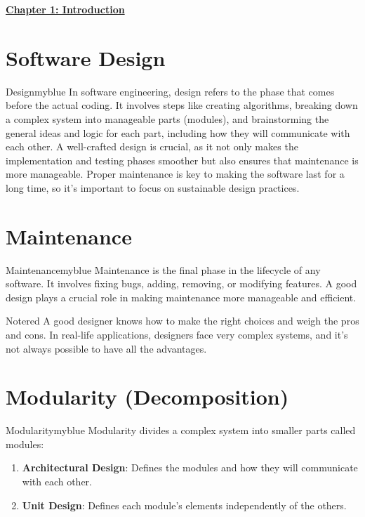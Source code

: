 \begin{center}
    \Huge{\textbf{\underline{Chapter 1: Introduction}}}
\end{center}

\setcounter{section}{0}

\vspace{0.35cm}


\section{Software Design}


\begin{prettyBox}{Design}{myblue}
In software engineering, design refers to the phase that comes before
the actual coding. It involves steps like creating algorithms, breaking
down a complex system into manageable parts (modules), and brainstorming
the general ideas and logic for each part, including how they will communicate
with each other. A well-crafted design is crucial, as it not only makes the
implementation and testing phases smoother but also ensures that maintenance 
is more manageable. Proper maintenance is key to making the software last 
for a long time, so it's important to focus on sustainable design practices.
\end{prettyBox}

\vspace{0.35cm}
\section{Maintenance}
\begin{prettyBox}{Maintenance}{myblue}
Maintenance is the final phase in the lifecycle of any software. It involves
fixing bugs, adding, removing, or modifying features. A good design plays a
crucial role in making maintenance more manageable and efficient.
\end{prettyBox}


\vspace{0.35cm}
\begin{prettyBox}{Note}{red}
A good designer knows how to make the right choices and weigh the 
pros and cons. In real-life applications, designers face very complex 
systems, and it's not always possible to have all the advantages.
\end{prettyBox}

\vspace{0.35cm}
\section{Modularity (Decomposition)}
\begin{prettyBox}{Modularity}{myblue}
Modularity divides a complex system into smaller parts called modules:
\begin{enumerate}
    \item \textbf{Architectural Design}: Defines the modules and how they will communicate with each other.
    \item \textbf{Unit Design}: Defines each module's elements independently of the others.
\end{enumerate}
\end{prettyBox}

